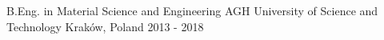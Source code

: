

\begin{cventries}

  \cventry
    {B.Eng. in Material Science and Engineering} %
    {AGH University of Science and Technology} %
    {Kraków, Poland} %
    {2013 - 2018} %
    {}

\end{cventries}
